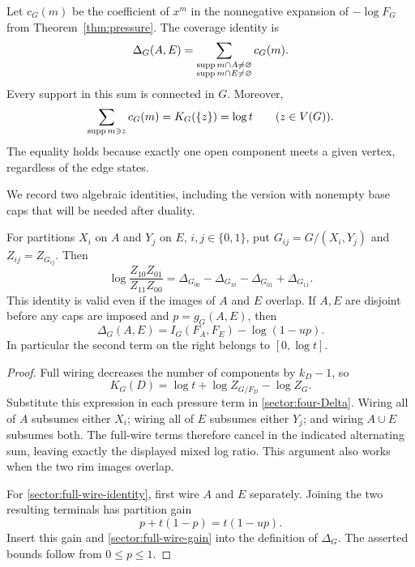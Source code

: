 Let $c_G(m)$ be the coefficient of $x^m$ in the nonnegative expansion
of $-\log F_G$ from Theorem~\ref{thm:pressure}.  The coverage identity is
\begin{equation}
 \Delta_G(A,E)
 =\sum_{\substack{\operatorname{supp} m\cap A\ne\varnothing\\
                    \operatorname{supp} m\cap E\ne\varnothing}}c_G(m).
 \label{sector:pressure-mass}
\end{equation}
Every support in this sum is connected in $G$.  Moreover,
\begin{equation}
 \sum_{\operatorname{supp} m\ni z}c_G(m)=K_G(\{z\})=\log t
 \qquad(z\in V(G)).
 \label{sector:one-vertex-mass}
\end{equation}
The equality holds because exactly one open component meets a given
vertex, regardless of the edge states.

We record two algebraic identities, including the version with
nonempty base caps that will be needed after duality.

\begin{lemma}
\label{sector:mixed-identities}
For partitions $X_i$ on $A$ and $Y_j$ on $E$, $i,j\in\{0,1\}$, put
$G_{ij}=G/(X_i,Y_j)$ and $Z_{ij}=Z_{G_{ij}}$.  Then
\begin{equation}
 \log\frac{Z_{10}Z_{01}}{Z_{11}Z_{00}}
 =\Delta_{G_{00}}-\Delta_{G_{10}}-\Delta_{G_{01}}
   +\Delta_{G_{11}}.
 \label{sector:four-Delta}
\end{equation}
This identity is valid even if the images of $A$ and $E$ overlap.
If $A,E$ are disjoint before any caps are imposed and
$p=g_G(A,E)$, then
\begin{equation}
 \Delta_G(A,E)=I_G(F_A,F_E)-\log(1-up).
 \label{sector:full-wire-identity}
\end{equation}
In particular the second term on the right belongs to $[0,\log t]$.
\end{lemma}

\begin{proof}
Full wiring decreases the number of components by $k_D-1$, so
\begin{equation}
 K_G(D)=\log t+\log Z_{G/F_D}-\log Z_G.
 \label{sector:full-wire-gain}
\end{equation}
Substitute this expression in each pressure term in
\eqref{sector:four-Delta}.  Wiring all of $A$ subsumes either $X_i$;
wiring all of $E$ subsumes either $Y_j$; and wiring $A\cup E$
subsumes both.  The full-wire terms therefore cancel in the indicated
alternating sum, leaving exactly the displayed mixed log ratio.  This
argument also works when the two rim images overlap.

For \eqref{sector:full-wire-identity}, first wire $A$ and $E$
separately.  Joining the two resulting terminals has partition gain
\[
 p+t(1-p)=t(1-up).
\]
Insert this gain and \eqref{sector:full-wire-gain} into the definition
of $\Delta_G$.  The asserted bounds follow from $0\le p\le1$.
\end{proof}

